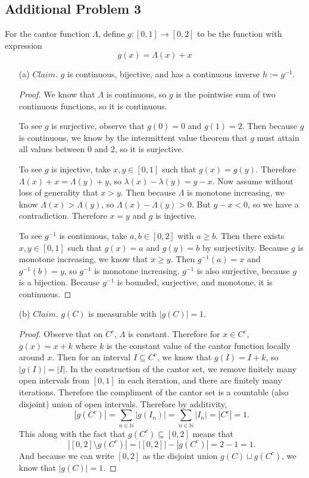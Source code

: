 \documentclass[12pt]{article}
\def\N{\mathbb{N}}
\begin{document}
\subsection*{Additional Problem 3}

For the cantor function $\Lambda$, define $g : [0,1] \to [0,2]$ to be the function with expression $$g(x) = \Lambda(x) + x$$
\begin{itemize}
    \item[(a)] $Claim.$ $g$ is continuous, bijective, and has a continuous inverse $h := g^{-1}$.
    
    \begin{proof}
        We know that $\Lambda$ is continuous, so $g$ is the pointwise sum of two continuous functions, so it is continuous.
        
        To see $g$ is surjective, observe that $g(0) = 0$ and $g(1) = 2$. Then because $g$ is continuous, we know by the intermittent value theorem that $g$ must attain all values between $0$ and $2$, so it is surjective.

        To see $g$ is injective, take $x, y \in [0,1]$ such that $g(x) = g(y)$. Therefore $\Lambda(x) + x = \Lambda(y) + y$, so $\lambda(x) - \lambda(y) = y -x$. Now assume without loss of generality that $x > y$. Then because $\Lambda$ is monotone increasing, we know $\Lambda(x) > \Lambda(y)$, so $\Lambda(x) - \Lambda(y) > 0$. But $y - x < 0$, so we have a contradiction. Therefore $x = y$ and $g$ is injective.

        To see $g^{-1}$ is continuous, take $a, b \in [0,2]$ with $a \geq b$. Then there exists $x, y \in [0,1]$ such that $g(x) = a$ and $g(y) = b$ by surjectivity. Because $g$ is monotone increasing, we know that $x \geq y$. Then $g^{-1}(a) = x$ and $g^{-1}(b) = y$, so $g^{-1}$ is monotone increasing. $g^{-1}$ is also surjective, because $g$ is a bijection. Because $g^{-1}$ is bounded, surjective, and monotone, it is continuous.
    \end{proof}

    \item[(b)] $Claim.$ $g(C)$ is measurable with $|g(C)|=1$. 
    
    \begin{proof}
        Observe that on $C^c$, $\Lambda$ is constant. Therefore for $x \in C^c$, $g(x) = x + k$ where $k$ is the constant value of the cantor function locally around $x$. Then for an interval $I \subseteq C^c$, we know that $g(I) = I + k$, so $|g(I)| = |I|$. In the construction of the cantor set, we remove finitely many open intervals from $[0,1]$ in each iteration, and there are finitely many iterations. Therefore the compliment of the cantor set is a countable (also disjoint) union of open intervals. Therefore by additivity, $$|g(C^c)| = \sum_{n\in\N} |g(I_n)| = \sum_{n\in\N} |I_n| = |C^c| = 1.$$ This along with the fact that $g(C^c) \subseteq [0,2]$ means that $$|[0,2] \setminus g(C^c)| = |[0,2]| - |g(C^c)| = 2 - 1 = 1.$$ And because we can write $[0,2]$ as the disjoint union $g(C) \sqcup g(C^c)$, we know that $|g(C)| = 1$.
    \end{proof}


\end{itemize}
\end{document}
